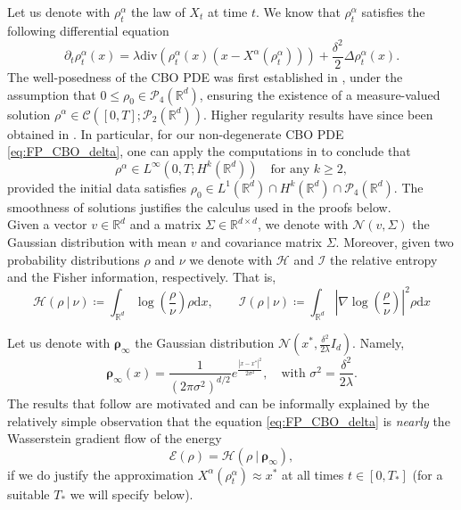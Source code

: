 \documentclass[reqno]{amsart}
\numberwithin{algorithm}{section}
\newcommand{\diff}{\mathrm{d}}
\newcommand{\dv}{\mathrm{div}}
\newcommand{\R}{\mathbb{R}}
\newcommand{\Xalpha}{{X^\alpha}}
\begin{document}
{Let us denote with $\rho^\alpha_t$ the law of $X_t$ at time $t$. We know that $\rho^\alpha_t$ satisfies the following differential equation
\begin{equation}\label{eq:FP_CBO_delta}
\partial_t\rho^\alpha_t(x) = \lambda \dv\left(\rho^\alpha_t(x)(x-\Xalpha(\rho^\alpha_t))\right) +\frac{\delta^2}{2}\Delta \rho^\alpha_t(x).
\end{equation}
The well-posedness of the CBO PDE was first established in \cite[Theorem 3.1, Theorem 3.2]{carrillo2018analytical}, under the assumption that $0 \leq \rho_0 \in \mathcal{P}_4(\mathbb{R}^d)$, ensuring the existence of a measure-valued solution $\rho^\alpha \in \mathcal{C}([0,T]; \mathcal{P}_2(\mathbb{R}^d))$. Higher regularity results have since been obtained in \cite{wang2025mathematical,fornasier2025regularity,fornasier2021consensus}. In particular, for our non-degenerate CBO PDE \eqref{eq:FP_CBO_delta}, one can apply the computations in \cite[Proposition 3]{wang2025mathematical} to conclude that
\begin{equation}
\rho^\alpha \in L^\infty(0,T; H^k(\mathbb{R}^d)) \quad \text{for any } k \geq 2,
\end{equation}
provided the initial data satisfies $\rho_0 \in L^1(\mathbb{R}^d) \cap H^k(\mathbb{R}^d) \cap \mathcal{P}_4(\mathbb{R}^d)$. {The smoothness of solutions justifies the calculus used in the proofs below.}\\



Given a vector $v\in\R^d$ and a matrix $\Sigma\in\R^{d\times d}$, we denote with $\mathcal N(v,\Sigma)$ the Gaussian distribution with mean $v$ and covariance matrix $\Sigma$. Moreover, given two probability distributions $\rho$ and $\nu$ we denote with $\mathcal H$ and $\mathcal I$ the relative entropy and the Fisher information, respectively. That is, 
\begin{equation*}
         \mathcal H(\rho\ |\ \nu) \coloneqq \int_{\R^d} \log\left(\frac{\rho}{\nu}\right)\rho \diff x, \qquad\mathcal I(\rho\ |\ \nu) \coloneqq \int_{\R^d} \left|\nabla \log\left(\frac{\rho}{\nu}\right)\right|^2\rho \diff x
\end{equation*}



Let us denote with $\boldsymbol\rho_\infty $ the Gaussian distribution $\mathcal N\left(x^*,\frac{\delta^2}{2\lambda}I_d\right)$. Namely,
$$\boldsymbol\rho_\infty(x) = \frac{1}{(2\pi\sigma^2)^{d/2}}e^\frac{ |x-x^*|^2}{2\sigma^2},\quad \text{with } \sigma^2 = \frac{\delta^2}{2\lambda}.$$
{The results that follow are motivated and can be informally explained by the relatively simple observation that the equation \eqref{eq:FP_CBO_delta} is {\it nearly} the Wasserstein gradient flow \cite{savare2008gradientflows} of the energy
$$
\mathcal E(\rho)=  \mathcal H(\rho\ |\ \boldsymbol\rho_\infty),
$$
if we do justify the approximation $\Xalpha(\rho^\alpha_t) \approx x^*$ at all times $t \in [0,T_*]$ (for a suitable $T_*$ we will specify below).}


}
\end{document}
